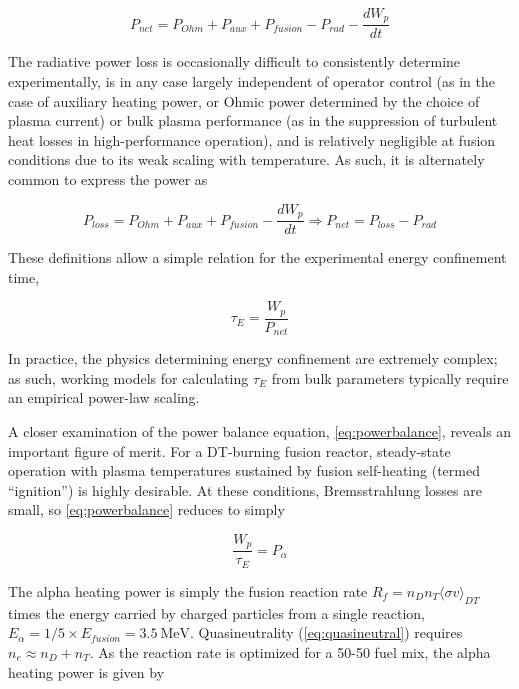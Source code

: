 \begin{equation}\label{eq:pnet}
 P_{net} = P_{Ohm} + P_{aux} + P_{fusion} - P_{rad} - \frac{dW_p}{dt}
\end{equation}

\noindent The radiative power loss is occasionally difficult to consistently determine experimentally, is in any case largely independent of operator control (as in the case of auxiliary heating power, or Ohmic power determined by the choice of plasma current) or bulk plasma performance (as in the suppression of turbulent heat losses in high-performance operation), and is relatively negligible at fusion conditions due to its weak scaling with temperature.  As such, it is alternately common to express the power as

\begin{equation}\label{eq:ploss}
 P_{loss} = P_{Ohm} + P_{aux} + P_{fusion} - \frac{dW_p}{dt} \Rightarrow P_{net} = P_{loss} - P_{rad}
\end{equation}

\noindent These definitions allow a simple relation for the experimental energy confinement time,

\begin{equation}\label{eq:tauE}
 \tau_E = \frac{W_p}{P_{net}}
\end{equation}

\noindent In practice, the physics determining energy confinement are extremely complex; as such, working models for calculating $\tau_E$ from bulk parameters typically require an empirical power-law scaling.

A closer examination of the power balance equation, \cref{eq:powerbalance}, reveals an important figure of merit.  For a DT-burning fusion reactor, steady-state operation with plasma temperatures sustained by fusion self-heating (termed ``ignition'') is highly desirable.  At these conditions, Bremsstrahlung losses are small, so \cref{eq:powerbalance} reduces to simply

\begin{equation}\label{eq:powerbalance2}
 \frac{W_p}{\tau_E} = P_{\alpha}
\end{equation}

\noindent The alpha heating power is simply the fusion reaction rate $R_f = n_D n_T \langle \sigma v \rangle_{DT}$ times the energy carried by charged particles from a single reaction, $E_\alpha = 1/5 \times E_{fusion} = \SI{3.5}{\mega\electronvolt}$.  Quasineutrality (\cref{eq:quasineutral}) requires $n_e \approx n_D + n_T$.  As the reaction rate is optimized for a 50-50 fuel mix, the alpha heating power is given by


